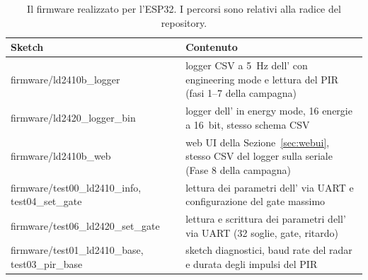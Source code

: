 \begin{table}[!htb]
\centering
\caption{Il firmware realizzato per l'ESP32. I percorsi sono relativi alla radice del repository.}
\label{tab:c3-14}
\small
\begin{tabularx}{\linewidth}{@{}>{\raggedright\arraybackslash}p{4.3cm}>{\raggedright\arraybackslash}X@{}}
\toprule
\textbf{Sketch} & \textbf{Contenuto} \\
\midrule
firmware/ld2410b\_\allowbreak{}logger & logger CSV a 5~Hz dell'\ldb{} con engineering mode e lettura del PIR (fasi 1--7 della campagna) \\
firmware/ld2420\_\allowbreak{}logger\_\allowbreak{}bin & logger dell'\ldc{} in energy mode, 16 energie a 16~bit, stesso schema CSV \\
firmware/ld2410b\_\allowbreak{}web & web UI della Sezione~\ref{sec:webui}, stesso CSV del logger sulla seriale (Fase 8 della campagna) \\
firmware/test00\_\allowbreak{}ld2410\_\allowbreak{}info,\allowbreak{} test04\_\allowbreak{}set\_\allowbreak{}gate & lettura dei parametri dell'\ldb{} via UART e configurazione del gate massimo \\
firmware/test06\_\allowbreak{}ld2420\_\allowbreak{}set\_\allowbreak{}gate & lettura e scrittura dei parametri dell'\ldc{} via UART (32 soglie, gate, ritardo) \\
firmware/test01\_\allowbreak{}ld2410\_\allowbreak{}base,\allowbreak{} test03\_\allowbreak{}pir\_\allowbreak{}base & sketch diagnostici, baud rate del radar e durata degli impulsi del PIR \\
\bottomrule
\end{tabularx}
\end{table}

